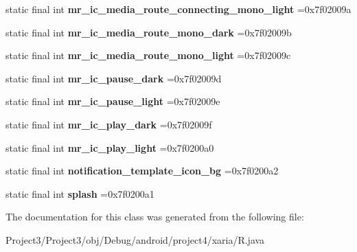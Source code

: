 \begin{DoxyCompactItemize}
\item 
\mbox{\label{classproject4_1_1xaria_1_1R_1_1drawable_aa538eb498f0d33b4cf4e86d4cf13e249}} 
static final int {\bfseries mr\+\_\+ic\+\_\+media\+\_\+route\+\_\+connecting\+\_\+mono\+\_\+light} =0x7f02009a
\item 
\mbox{\label{classproject4_1_1xaria_1_1R_1_1drawable_a7258f86fb6c2ff2c63f2bc1dffbf827e}} 
static final int {\bfseries mr\+\_\+ic\+\_\+media\+\_\+route\+\_\+mono\+\_\+dark} =0x7f02009b
\item 
\mbox{\label{classproject4_1_1xaria_1_1R_1_1drawable_aecaa4b3784570212c50a590a52754df9}} 
static final int {\bfseries mr\+\_\+ic\+\_\+media\+\_\+route\+\_\+mono\+\_\+light} =0x7f02009c
\item 
\mbox{\label{classproject4_1_1xaria_1_1R_1_1drawable_a12ab6475aea6384ffb0d3260c1f7f349}} 
static final int {\bfseries mr\+\_\+ic\+\_\+pause\+\_\+dark} =0x7f02009d
\item 
\mbox{\label{classproject4_1_1xaria_1_1R_1_1drawable_aacecffecec4ecb0c298a658835f5484f}} 
static final int {\bfseries mr\+\_\+ic\+\_\+pause\+\_\+light} =0x7f02009e
\item 
\mbox{\label{classproject4_1_1xaria_1_1R_1_1drawable_a4c1c896ca5b1d6d2a9c5f15d5378b360}} 
static final int {\bfseries mr\+\_\+ic\+\_\+play\+\_\+dark} =0x7f02009f
\item 
\mbox{\label{classproject4_1_1xaria_1_1R_1_1drawable_a401364e479be16a84ff199fa67c80b05}} 
static final int {\bfseries mr\+\_\+ic\+\_\+play\+\_\+light} =0x7f0200a0
\item 
\mbox{\label{classproject4_1_1xaria_1_1R_1_1drawable_acb6411e582b7566456686d034abb2bb4}} 
static final int {\bfseries notification\+\_\+template\+\_\+icon\+\_\+bg} =0x7f0200a2
\item 
\mbox{\label{classproject4_1_1xaria_1_1R_1_1drawable_a1cd67a5e896e775f2afea4ca5a944d54}} 
static final int {\bfseries splash} =0x7f0200a1
\end{DoxyCompactItemize}


The documentation for this class was generated from the following file\+:\begin{DoxyCompactItemize}
\item 
Project3/\+Project3/obj/\+Debug/android/project4/xaria/R.\+java\end{DoxyCompactItemize}

